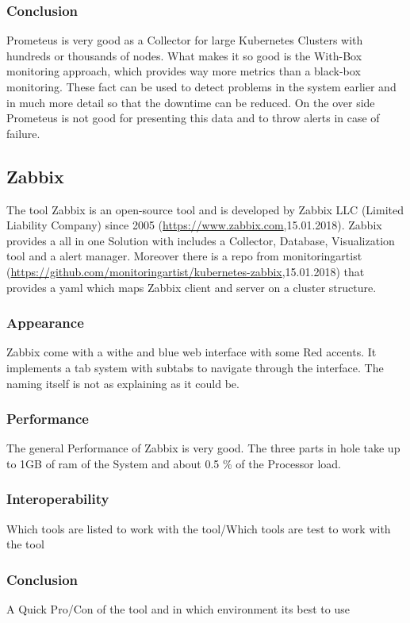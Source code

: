 \subsubsection{Conclusion}
Prometeus is very good as a Collector for large Kubernetes Clusters with hundreds or thousands of nodes. What makes it so good is the With-Box monitoring approach, which provides way more metrics than a black-box monitoring. These fact can be used to detect problems in the system earlier and in much more detail so that the downtime can be reduced. On the over side Prometeus is not good for presenting this data and to throw alerts in case of failure.

\subsection{Zabbix}
\label{Toolname} %
The tool Zabbix is an open-source tool and is developed by Zabbix LLC (Limited Liability Company) since 2005 (\url{https://www.zabbix.com},15.01.2018). Zabbix provides a all in one Solution with includes a Collector, Database, Visualization tool and a alert manager. Moreover there is a repo from monitoringartist (\url{https://github.com/monitoringartist/kubernetes-zabbix},15.01.2018) that provides a yaml which maps Zabbix client and server on a cluster structure.  
\subsubsection{Appearance}%
Zabbix come with a withe and blue web interface with some Red accents. It implements a tab system with subtabs to navigate through the interface. The naming itself is not as explaining as it could be.  
\subsubsection{Performance}
The general Performance of Zabbix is very good. The three parts in hole take up to 1GB of ram of the System and about 0.5 \% of the Processor load.
\subsubsection{Interoperability}
Which tools are listed to work with the tool/Which tools are test to work with the tool
\subsubsection{Conclusion}
A Quick Pro/Con of the tool and in which environment its best to use

